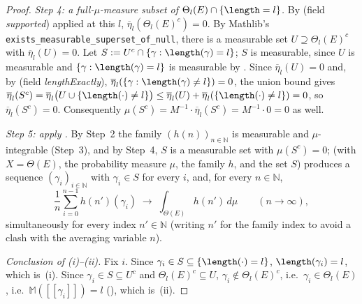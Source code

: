 \begin{proof}
  \emph{Step 4: a full-$\mu$-measure subset of $\Theta_l(E) \cap \{\length=l\}$.} By
   (field \emph{supported}) applied at this $l$, $\overline\eta_l(\Theta_l(E)^c)
  = 0$. By Mathlib's \texttt{exists\_measurable\_superset\_of\_null}, there is a measurable set
  $U \supseteq \Theta_l(E)^c$ with $\overline\eta_l(U) = 0$. Let
  $S := U^c \cap \{\gamma : \length(\gamma) = l\}$; $S$ is measurable, since $U$ is measurable and
  $\{\gamma : \length(\gamma)=l\}$ is measurable by . Since
  $\overline\eta_l(U) = 0$ and, by  (field \emph{lengthExactly}),
  $\overline\eta_l(\{\gamma : \length(\gamma) \ne l\}) = 0$, the union bound gives
  $\overline\eta_l(S^c) = \overline\eta_l\bigl(U \cup \{\length(\cdot)\ne l\}\bigr) \le
  \overline\eta_l(U) + \overline\eta_l(\{\length(\cdot)\ne l\}) = 0$, so $\overline\eta_l(S^c)=0$.
  Consequently $\mu(S^c) = M^{-1}\cdot\overline\eta_l(S^c) = M^{-1}\cdot 0 = 0$ as well.

  \emph{Step 5: apply .} By Step~2 the family $(h(n))_{n \in
  \mathbb{N}}$ is measurable and $\mu$-integrable (Step~3), and by Step~4, $S$ is a measurable set
  with $\mu(S^c)=0$;  (with $X = \Theta(E)$, the probability
  measure $\mu$, the family $h$, and the set $S$) produces a sequence $(\gamma_i)_{i\in\mathbb{N}}$
  with $\gamma_i \in S$ for every $i$, and, for every $n \in \mathbb{N}$,
  \[
    \frac{1}{n}\sum_{i=0}^{n-1} h(n')(\gamma_i) \;\longrightarrow\; \int_{\Theta(E)} h(n')\,d\mu
    \qquad (n\to\infty)
    ,
    \tag{$\ast\ast$}
  \]
  simultaneously for every index $n' \in \mathbb{N}$ (writing $n'$ for the family index to avoid a
  clash with the averaging variable $n$).

  \emph{Conclusion of (i)--(ii).} Fix $i$. Since $\gamma_i \in S \subseteq \{\length(\cdot)=l\}$,
  $\length(\gamma_i) = l$, which is~(i). Since $\gamma_i \in S \subseteq U^c$ and
  $\Theta_l(E)^c \subseteq U$, $\gamma_i \notin \Theta_l(E)^c$, i.e.\ $\gamma_i \in \Theta_l(E)$,
  i.e.\ $\mathbb{M}([[\gamma_i]]) = l$ (), which is~(ii).


\end{proof}
